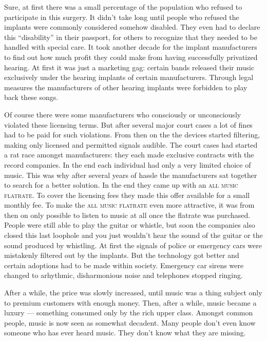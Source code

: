 \documentclass[11pt,paper=a5,pagesize,english,openright,twoside]{scrbook}
\begin{document}
Sure, at first there was a small percentage of the population who refused to 
participate in this surgery.
It didn't take long until people who refused the implants were commonly 
considered somehow disabled. They even had to declare this ``disability'' 
in their passport, for others to recognize that they needed to be handled 
with special care. It took another
decade for the implant manufacturers to find out how much profit they could
make from having successfully privatized hearing. At first it was just a
marketing gag: certain bands released their music exclusively
under the hearing implants of certain manufacturers. Through legal measures
the manufacturers of other hearing implants were forbidden to play back these
songs.

Of course there were some manufacturers who consciously or unconsciously
violated these licensing terms. But after several major court cases
a lot of fines had to be paid for such violations. From then on the 
the devices started filtering, making only licensed and permitted signals 
audible.
The court cases had started a rat race amongst manufacturers: they each made
exclusive contracts with the record companies. In the end each individual
had only a very limited choice of music. This was why after several years
of hassle the manufacturers sat together to search for a better solution.
In the end they came up with an \textsc{all music flatrate\texttrademark}. 
To cover the licensing fees they made this offer available for
a small monthly fee. To make the \textsc{all music flatrate\texttrademark} 
even more attractive, it was from then on only possible to listen to music at 
all once the flatrate was purchased. People were still able to play the 
guitar or whistle, but soon the companies also closed this last loophole 
and you just wouldn't hear the sound of the guitar or the sound produced by 
whistling.
At first the signals of police or emergency cars were mistakenly filtered out 
by the implants. But the technology got better and certain adoptions had to 
be made within society. Emergency car sirens were changed to arhythmic, 
disharmonious noise and telephones stopped ringing.

After a while, the price was slowly increased, until music was a thing subject 
only to premium customers with enough money. Then, after a while, music
became a luxury --- something consumed only by the rich upper class. Amongst
common people, music is now seen as somewhat decadent. Many people don't
even know someone who has ever heard music. They don't know what they are
missing.
\end{document}
